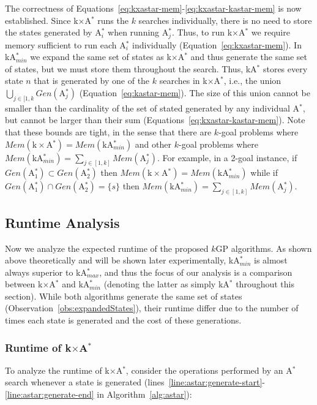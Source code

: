 \documentclass{aicom2e}
\newcommand{\kgs}{$k$GP}
\newcommand{\astar}{A$^*$}
\newcommand{\kastar}{kA$^*$}
\newcommand{\kastarmin}{kA$^*_{min}$}
\newcommand{\kastarmax}{kA$^*_{max}$}
\newcommand{\kxastar}{k$\times$A$^*$}
\newcommand{\astari}[1]{A$^*_#1$}
\begin{document}
The correctness of Equations~\ref{eq:kxastar-mem}-\ref{eq:kxastar-kastar-mem}
is now established. Since \kxastar{} runs the $k$ searches individually, there is
no need to store the states generated by \astari{i} when running \astari{j}.
Thus, to run \kxastar{} we require memory sufficient to run each \astari{i}
individually (Equation~\ref{eq:kxastar-mem}). In \kastarmin{} we expand the
same set of states as \kxastar{} and thus generate the same set of states, but
we must store them throughout the search. Thus, \kastar{} stores every state
$n$ that is  generated by one of the $k$ searches in \kxastar{}, i.e., the
union $\bigcup_{j\in[1,k}Gen(\text{\astari{j}})$
(Equation~\ref{eq:kastar-mem}). The size of this union cannot be smaller than
the cardinality of the set of stated generated by any individual \astar{}, but
cannot be larger than their sum (Equations~\ref{eq:kxastar-kastar-mem}). Note
that these bounds are tight, in the sense that there are $k$-goal problems
where $Mem(\text{\kxastar{}}) = Mem(\text{\kastarmin{}})$ and other $k$-goal
problems where $Mem(\text{\kastarmin{}}) = \sum_{j\in[1,k]}
Mem(\text{\astari{j}})$. For example, in a 2-goal instance, 
if $Gen(\text{\astari{1}})\subset Gen(\text{\astari{2}})$ then 
$Mem(\text{\kxastar{}}) = Mem(\text{\kastarmin{}})$ 
while if $Gen(\text{\astari{1}})\cap Gen(\text{\astari{2}})=\{s\}$ then 
$Mem(\text{\kastarmin{}}) = \sum_{j\in[1,k]}
Mem(\text{\astari{j}})$. 

\subsection{Runtime Analysis}

Now we analyze the expected runtime of the proposed \kgs{} algorithms. As shown
above theoretically and will be shown later experimentally, \kastarmin{} is
almost always superior to \kastarmax{}, and thus the focus of our analysis is a
comparison between \kxastar{} and \kastarmin{} (denoting the latter as simply \kastar{} throughout this section).  While both algorithms generate
the same set of states (Observation~\ref{obs:expandedStates}), their runtime
differ due to the number of times each state is generated and the cost of these
generations. 



\subsubsection{Runtime of \kxastar{}}
To analyze the runtime of \kxastar{}, consider the operations performed by an \astar{} search whenever a state is generated (lines~\ref{line:astar:generate-start}-\ref{line:astar:generate-end} in
Algorithm~\ref{alg:astar}):
\end{document}
